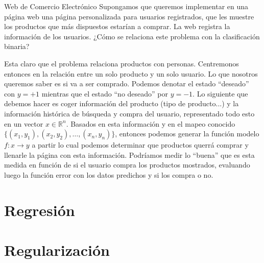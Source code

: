 \begin{Ejemplo}{Web de Comercio Electrónico}
    Supongamos que queremos implementar en una página web una página personalizada para usuarios registrados, que les muestre los productos que más dispuestos estarían a comprar. La web registra la información de los usuarios. ¿Cómo se relaciona este problema con la clasificación binaria? 

    Esta claro que el problema relaciona productos con personas. Centremonos entonces en la relación entre un solo producto y un solo usuario. Lo que nosotros queremos saber es si va a ser comprado. Podemos denotar el estado ``deseado'' con $y=+1$ mientras que el estado ``no deseado'' por $y=-1$. Lo siguiente que debemos hacer es coger información del producto (tipo de producto...) y la información histórica de búsqueda y compra del usuario, representado todo esto en un vector $x \in \mathbb{R}^n$. Basados en esta información y en el mapeo conocido $\{(x_1,y_1),(x_2,y_2),\ldots,(x_n,y_n)\}$, entonces podemos generar la función modelo $f:x\to y$ a partir lo cual podemos determinar que productos querrá comprar y llenarle la página con esta información. Podríamos medir lo ``buena'' que es esta medida en función de si el usuario compra los productos mostrados, evaluando luego la función error con los datos predichos y si los compra o no. 

\end{Ejemplo}


\section{Regresión}

\section{Regularización}